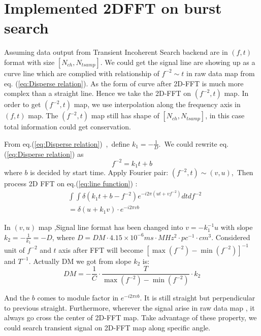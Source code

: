 \documentclass[twocolumn]{aastex61}
\begin{document}
\section{Implemented 2DFFT on burst search}
Assuming data output from Transient Incoherent Search backend are in $(f,t)$ format with size $[N_{ch},N_{tsamp}]$. We could get the signal line are showing up as a curve line which are complied with relationship of $f^{-2}\sim t$ in raw data map from eq. (\ref{eq:Disperse relation}). As the form of curve after 2D-FFT is much more complex than a straight line. Hence we take the 2D-FFT on $(f^{-2},t)$ map. In order to get $(f^{-2},t)$ map, we use interpolation along the frequency axis in $(f,t)$ map. The $(f^{-2},t)$ map still has shape of $[N_{ch},N_{tsamp}]$\label{rebin_shape}, in this case total information could get conservation.

From eq.(\ref{eq:Disperse relation})~,~define $k_1 =- \frac{1}{D} $.~We could rewrite eq.(\ref{eq:Disperse relation}) as 
\begin{equation}
f^{-2}=k_1t +b\label{eq:line function}
\end{equation}
where $b$ is decided by start time. Apply Fourier pair:
$(f^{-2},t) \sim (v,u)$,~Then process 2D FFT on eq.(\ref{eq:line function}) :
\begin{equation} \begin{aligned}
&\int\int\delta(k_1t+b-f^{-2})e^{-i2\pi(ut+vf^{-2})}dtdf^{-2}
\\ &=\delta(u+k_1v)\cdot e^{-i2\pi vb}
\end{aligned}
\end{equation}

In $(v,u)$ map ,Signal line format has been changed into $v=-k_1^{-1} u$ with slope $k_2 =-\frac{1}{k_1}=-D$, where $D=DM\cdot4.15 \times 10^{-6} ms \cdot MHz^2 \cdot pc^{-1} \cdot cm^3$. Considered unit of $f^{-2}$ and $t$ axis after FFT will become $[\max(f^{-2}) - \min(f^{-2})]^{-1}$ and $T^{-1}$. Actually DM we got from slope $k_2$ is:
\begin{equation}
DM = -\frac{1}{C}\cdot\frac{T}{\max(f^{-2}) - \min(f^{-2})}\cdot k_2 \label{seq:DM Calculate}
\end{equation}

And the $b$ comes to module factor in $e^{-i2\pi vb}$. It is still straight but perpendicular to previous straight. Furthermore,  wherever the signal arise in raw data map , it always go cross the center of 2D-FFT map. Take advantage of these property, we could search transient signal on 2D-FFT map along specific angle. 
\end{document}
